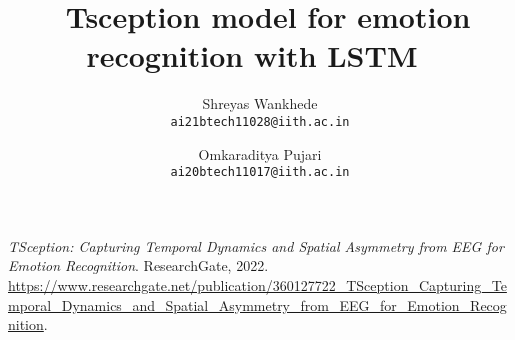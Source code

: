 \documentclass[10pt,twocolumn,letterpaper]{article}
\title{\ Tsception model for emotion recognition with LSTM\ }
\author{Shreyas Wankhede\\
{\tt\small ai21btech11028@iith.ac.in}
\and
Omkaraditya Pujari\\
{\tt\small ai20btech11017@iith.ac.in}
}
\begin{document}
\maketitle
   
 





{
    \small
    \nocite{*}
    
}

% 
\begin{thebibliography}{9}
\textit{TSception: Capturing Temporal Dynamics and Spatial Asymmetry from EEG for Emotion Recognition}.
ResearchGate, 2022.
\url{https://www.researchgate.net/publication/360127722_TSception_Capturing_Temporal_Dynamics_and_Spatial_Asymmetry_from_EEG_for_Emotion_Recognition}.
\end{thebibliography}
\end{document}
